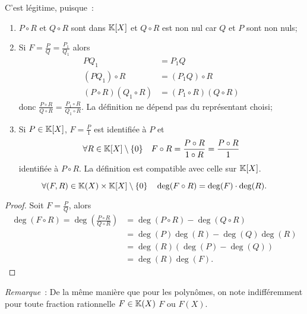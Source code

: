 C'est légitime, puisque~:
\begin{enumerate}
  \item \(P \circ R\) et \(Q \circ R\) sont dans \(\mathbb{K}[X]\) et \(Q \circ R\) est non nul car \(Q\) et \(P\) sont non nuls;
  \item Si \(F=\frac{P}{Q}=\frac{P_1}{Q_1}\) alors
    \begin{align}
      PQ_1&=P_1Q \\
      (PQ_1) \circ R &= (P_1Q) \circ R\\
      (P\circ R)(Q_1\circ R) &= (P_1\circ R)(Q\circ R)
    \end{align}
    donc \(\frac{P \circ R}{Q \circ R}=\frac{P_1 \circ R}{Q_1 \circ R}\). La définition ne dépend pas du représentant choisi;
  \item Si \(P \in \mathbb{K}[X]\), \(F=\frac{P}{1}\) est identifiée à \(P\) et
    \begin{equation}
      \forall R \in \mathbb{K}[X]\setminus\{0\} \quad F \circ R = \frac{P \circ R}{1 \circ R}=\frac{P \circ R}{1}  
    \end{equation}
    identifiée à \(P\circ R\). La définition est compatible avec celle sur \(\mathbb{K}[X]\).
\end{enumerate}

\begin{prop}
  \begin{equation}
    \forall (F,R) \in \mathbb{K}(X)\times\mathbb{K}[X]\setminus\{0\} \quad \deg(F \circ R)=\deg(F) \cdot \deg(R).
  \end{equation}
\end{prop}
\begin{proof}
  Soit \(F=\frac{P}{Q}\), alors
  \begin{align}
    \deg(F \circ R) = \deg\left(\frac{P \circ R}{Q \circ R}\right) &= \deg(P\circ R) - \deg(Q\circ R) \\
                                                                   &=\deg(P)\deg(R)-\deg(Q)\deg(R)\\
                                                                   &=\deg(R)(\deg(P)-\deg(Q))\\
                                                                   &=\deg(R)\deg(F).
  \end{align}
\end{proof}

\emph{Remarque}~: De la même manière que pour les polynômes, on note indifféremment pour toute fraction rationnelle \(F \in \mathbb{K}(X)\) \(F\) ou \(F(X)\).

